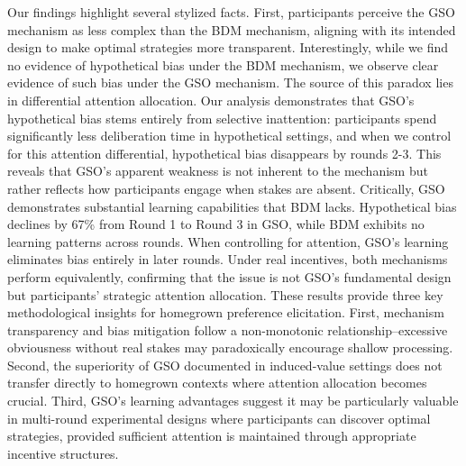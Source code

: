 \documentclass[12pt]{article}
\begin{document}
Our findings highlight several stylized facts. First, participants perceive the GSO mechanism as less complex than the BDM mechanism, aligning with its intended design to make optimal strategies more transparent. Interestingly, while we find no evidence of hypothetical bias under the BDM mechanism, we observe clear evidence of such bias under the GSO mechanism. 
The source of this paradox lies in differential attention allocation. Our analysis demonstrates that GSO's hypothetical bias stems entirely from selective inattention: participants spend significantly less deliberation time in hypothetical settings, and when we control for this attention differential, hypothetical bias disappears by rounds 2-3. This reveals that GSO's apparent weakness is not inherent to the mechanism but rather reflects how participants engage when stakes are absent.
Critically, GSO demonstrates substantial learning capabilities that BDM lacks. Hypothetical bias declines by 67\% from Round 1 to Round 3 in GSO, while BDM exhibits no learning patterns across rounds. When controlling for attention, GSO's learning eliminates bias entirely in later rounds. Under real incentives, both mechanisms perform equivalently, confirming that the issue is not GSO's fundamental design but participants' strategic attention allocation.
These results provide three key methodological insights for homegrown preference elicitation. First, mechanism transparency and bias mitigation follow a non-monotonic relationship--excessive obviousness without real stakes may paradoxically encourage shallow processing. Second, the superiority of GSO documented in induced-value settings does not transfer directly to homegrown contexts where attention allocation becomes crucial. Third, GSO's learning advantages suggest it may be particularly valuable in multi-round experimental designs where participants can discover optimal strategies, provided sufficient attention is maintained through appropriate incentive structures.
\end{document}
